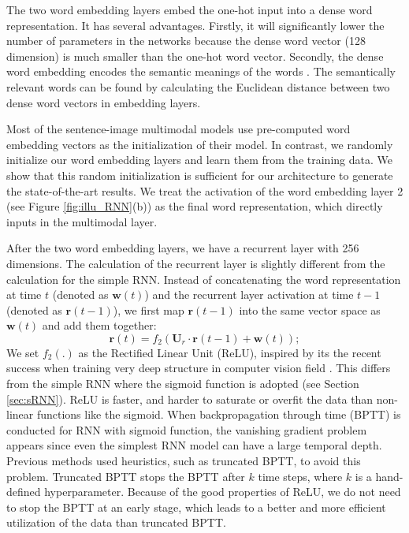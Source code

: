 The two word embedding layers embed the one-hot input into a dense word representation.
It has several advantages.
Firstly, it will significantly lower the number of parameters in the networks because the dense word vector (128 dimension) is much smaller than the one-hot word vector.
Secondly, the dense word embedding encodes the semantic meanings of the words \cite{mikolov2013efficient}.
The semantically relevant words can be found by calculating the Euclidean distance between two dense word vectors in embedding layers.

Most of the sentence-image multimodal models \cite{karpathy2014fragment,frome2013devise,socher2014grounded,kiros2013multimodal} use pre-computed word embedding vectors as the initialization of their model. 
In contrast, we randomly initialize our word embedding layers and learn them from the training data.
We show that this random initialization is sufficient for our architecture to generate the state-of-the-art results.
We treat the activation of the word embedding layer 2 (see Figure \ref{fig:illu_RNN}(b)) as the final word representation, which directly inputs in the multimodal layer.

After the two word embedding layers, we have a recurrent layer with 256 dimensions.
The calculation of the recurrent layer is slightly different from the calculation for the simple RNN.
Instead of concatenating the word representation at time $t$ (denoted as $\mathbf{w}(t)$) and the recurrent layer activation at time $t-1$ (denoted as $\mathbf{r}(t-1)$), we first map $\mathbf{r}(t-1)$ into the same vector space as $\mathbf{w}(t)$ and add them together:
\begin{equation}
\mathbf{r}(t)=f_2(\mathbf{U}_r \cdot \mathbf{r}(t-1) + \mathbf{w}(t));
\end{equation}
We set $f_2(.)$ as the Rectified Linear Unit (ReLU), inspired by its the recent success when training very deep structure in computer vision field \cite{krizhevsky2012imagenet}.
This differs from the simple RNN where the sigmoid function is adopted (see Section \ref{sec:sRNN}).
ReLU is faster, and harder to saturate or overfit the data than non-linear functions like the sigmoid.
When backpropagation through time (BPTT) \cite{rumelhart1988learning} is conducted for RNN with sigmoid function, the vanishing gradient problem appears since even the simplest RNN model can have a large temporal depth.
Previous methods \cite{mikolov2010recurrent,mikolov2011extensions} used heuristics, such as truncated BPTT, to avoid this problem.
Truncated BPTT stops the BPTT after $k$ time steps, where $k$ is a hand-defined hyperparameter.
Because of the good properties of ReLU, we do not need to stop the BPTT at an early stage, which leads to a better and more efficient utilization of the data than truncated BPTT.


